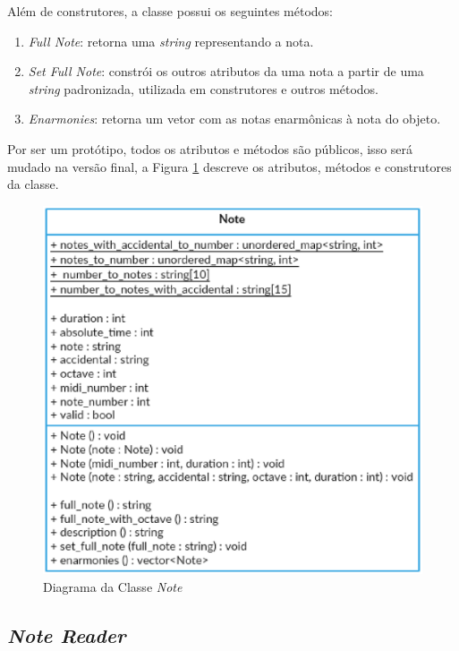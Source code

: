       Além de construtores, a classe possui os seguintes métodos:

      \begin{enumerate}
        \item \textit{Full Note}: retorna uma \textit{string} representando a nota.
        \item \textit{Set Full Note}: constrói os outros atributos da uma nota a partir de uma \textit{string} padronizada, utilizada em construtores e outros métodos.
        \item \textit{Enarmonies}: retorna um vetor com as notas enarmônicas à nota do objeto.
      \end{enumerate}

      Por ser um protótipo, todos os atributos e métodos são públicos, isso será mudado na versão final, a Figura \ref{noteclass} descreve os atributos, métodos e construtores da classe.

      \begin{figure}[htb]
        \centering
        \includegraphics[scale=0.7]{figuras/noteclass.eps}
        \caption{Diagrama da Classe \textit{Note}}
        \label{noteclass}
      \end{figure}

    \subsection[\textit{Note Reader}]{\textit{Note Reader}}


